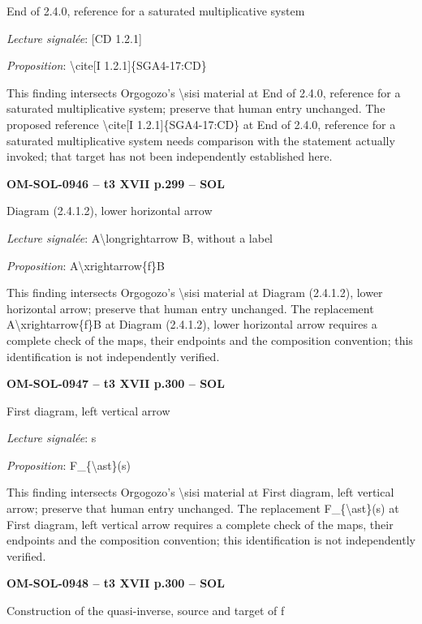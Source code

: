 End of 2.4.0, reference for a saturated multiplicative system\par
\emph{Lecture signalée}: [CD 1.2.1]\par
\emph{Proposition}: \textbackslash{}cite[I 1.2.1]\{SGA4-17:CD\}\par
This finding intersects Orgogozo's \textbackslash{}sisi material at End of 2.4.0, reference for a saturated multiplicative system; preserve that human entry unchanged. The proposed reference \textbackslash{}cite[I 1.2.1]\{SGA4-17:CD\} at End of 2.4.0, reference for a saturated multiplicative system needs comparison with the statement actually invoked; that target has not been independently established here.\par
\par\noindent\textbf{OM-SOL-0946 -- t3 XVII p.299 -- SOL}\par
Diagram (2.4.1.2), lower horizontal arrow\par
\emph{Lecture signalée}: A\textbackslash{}longrightarrow B, without a label\par
\emph{Proposition}: A\textbackslash{}xrightarrow\{f\}B\par
This finding intersects Orgogozo's \textbackslash{}sisi material at Diagram (2.4.1.2), lower horizontal arrow; preserve that human entry unchanged. The replacement A\textbackslash{}xrightarrow\{f\}B at Diagram (2.4.1.2), lower horizontal arrow requires a complete check of the maps, their endpoints and the composition convention; this identification is not independently verified.\par
\par\noindent\textbf{OM-SOL-0947 -- t3 XVII p.300 -- SOL}\par
First diagram, left vertical arrow\par
\emph{Lecture signalée}: s\par
\emph{Proposition}: F\_\{\textbackslash{}ast\}(s)\par
This finding intersects Orgogozo's \textbackslash{}sisi material at First diagram, left vertical arrow; preserve that human entry unchanged. The replacement F\_\{\textbackslash{}ast\}(s) at First diagram, left vertical arrow requires a complete check of the maps, their endpoints and the composition convention; this identification is not independently verified.\par
\par\noindent\textbf{OM-SOL-0948 -- t3 XVII p.300 -- SOL}\par
Construction of the quasi-inverse, source and target of f\par
